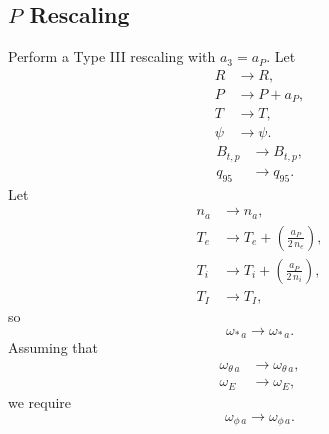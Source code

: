 \documentclass[12pt]{article}
\begin{document}
\subsection{$P$ Rescaling}
Perform a Type III rescaling with $a_3=a_P$. 
Let 
\begin{align}
R&\rightarrow R,\\[0.5ex]
P&\rightarrow P + a_P,\\[0.5ex]
T&\rightarrow T,\\[0.5ex]
\psi&\rightarrow \psi.
\end{align}
\begin{align}
B_{t,p} &\rightarrow B_{t,p},\\[0.5ex]
q_{95}&\rightarrow q_{95}.
\end{align}
Let
\begin{align}
n_a&\rightarrow n_a,\\[0.5ex]
T_e&\rightarrow T_e + \left(\frac{a_P}{2\,n_e}\right),\\[0.5ex]
T_i&\rightarrow T_i+\left(\frac{a_P}{2\,n_i}\right),\\[0.5ex]
T_I&\rightarrow T_I,
\end{align}
so
\begin{equation}
\omega_{\ast\,a} \rightarrow \omega_{\ast\,a}.
\end{equation}
Assuming that
\begin{align}
\omega_{\theta\,a}&\rightarrow\omega_{\theta\,a},\\[0.5ex]
\omega_E &\rightarrow \omega_E,
\end{align}
we require
\begin{equation}
\omega_{\phi\,a}\rightarrow \omega_{\phi\,a}.
\end{equation}
\end{document}
